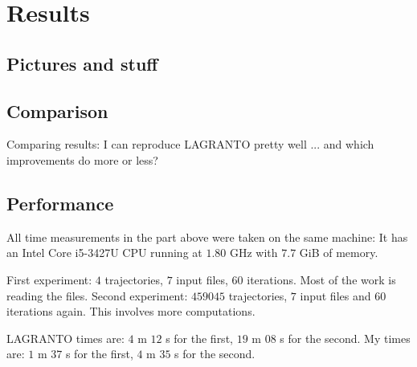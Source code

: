 \chapter{Results}

\section{Pictures and stuff}


\section{Comparison}
Comparing results: I can reproduce LAGRANTO pretty well ... and which improvements do more or less?

\section{Performance}
All time measurements in the part above were taken on the same machine: It has an Intel\textsuperscript{\textregistered} Core\textsuperscript{\texttrademark} i5-3427U CPU running at $1.80$ GHz with $7.7$ GiB of memory.

First experiment: $4$ trajectories, $7$ input files, $60$ iterations. Most of the work is reading the files.
Second experiment: $459045$ trajectories, $7$ input files and $60$ iterations again. This involves more computations.

LAGRANTO times are: $4$ m $12$ s for the first, $19$ m $08$ s for the second.
My times are: $1$ m $37$ s for the first, $4$ m $35$ s for the second.
